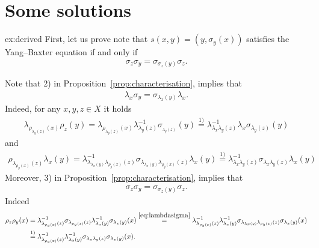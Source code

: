 \section*{Some solutions}

\fancyhf{}
\fancyfoot[R]{\thepage}
\fancyhead[L]{\course}
\setlength{\headheight}{14pt}



\begin{sol}{ex:derived}
    First, let us prove note that $s(x,y) =(y,\sigma_y(x))$ satisfies the Yang--Baxter equation if and only if 
    \begin{align*}
        \sigma_z\sigma_y=\sigma_{\sigma_z(y)}\sigma_z.
    \end{align*}

    Note that 2) in Proposition~\ref{prop:characterisation}, implies that 
    \begin{align}\label{eq:lambdasigma}
        \lambda_x\sigma_y = \sigma_{\lambda_x(y)}\lambda_x.
    \end{align}
    Indeed, for any $x,y,z\in X$ it holds
    \begin{align*}
        \lambda_{\rho_{\lambda_y(z)}(x)}\rho_z(y)= \lambda_{\rho_{\lambda_y(z)}(x)}\lambda^{-1}_{\lambda_y(z)}\sigma_{_{\lambda_y(z)}}(y)
        \overset{1)}{=}\lambda^{-1}_{\lambda_x\lambda_y(z)}\lambda_x\sigma_{\lambda_y(z)}(y)
    \end{align*}
    and
    \begin{align*}
        \rho_{\lambda_{\rho_y(x)}(z)}\lambda_x(y) = \lambda^{-1}_{\lambda_{\lambda_x(y)}\lambda_{\rho_y(x)}(z)}\sigma_{\lambda_{\lambda_x(y)}\lambda_{\rho_y(x)}(z)}\lambda_x(y)\overset{1)}{=}\lambda^{-1}_{\lambda_x\lambda_y(z)}\sigma_{\lambda_x\lambda_y(z)}\lambda_x(y)
    \end{align*}
    Moreover, 3) in  Proposition~\ref{prop:characterisation}, implies that 
    \begin{align*}
        \sigma_z\sigma_y=\sigma_{\sigma_z(y)}\sigma_z.
    \end{align*}
    Indeed
    \begin{align*}
        \rho_z\rho_y(x) &=\lambda^{-1}_{\lambda_{\rho_y(x)}(z)}\sigma_{\lambda_{\rho_y(x)}(z)}\lambda^{-1}_{\lambda_x(y)}\sigma_{\lambda_x(y)}(x)
        \overset{\eqref{eq:lambdasigma}}{=}\lambda^{-1}_{\lambda_{\rho_y(x)}(z)}\lambda^{-1}_{\lambda_x(y)}\sigma_{\lambda_{\lambda_x(y)}\lambda_{\rho_y(x)}(z)}\sigma_{\lambda_x(y)}(x)\\
        &\overset{1)}{=}\lambda^{-1}_{\lambda_{\rho_y(x)}(z)}\lambda^{-1}_{\lambda_x(y)}\sigma_{\lambda_x\lambda_y(z)}\sigma_{\lambda_x(y)}(x).

\end{align*}
\end{sol}
